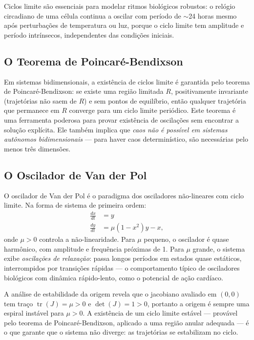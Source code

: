 Ciclos limite são essenciais para modelar ritmos biológicos robustos: o relógio circadiano
de uma célula continua a oscilar com período de $\sim$24 horas mesmo após perturbações de
temperatura ou luz, porque o ciclo limite tem amplitude e período intrínsecos, independentes
das condições iniciais.

\subsection{O Teorema de Poincaré-Bendixson}

Em sistemas bidimensionais, a existência de ciclos limite é garantida pelo teorema de
Poincaré-Bendixson: se existe uma região limitada $R$, positivamente invariante (trajetórias
não saem de $R$) e sem pontos de equilíbrio, então qualquer trajetória que permanece em $R$
converge para um ciclo limite periódico. Este teorema é uma ferramenta poderosa para provar
existência de oscilações sem encontrar a solução explícita. Ele também implica que
\emph{caos não é possível em sistemas autônomos bidimensionais} --- para haver caos
determinístico, são necessárias pelo menos três dimensões.

\subsection{O Oscilador de Van der Pol}

O oscilador de Van der Pol é o paradigma dos osciladores não-lineares com ciclo limite. Na
forma de sistema de primeira ordem:
\begin{align}
  \frac{dx}{dt} &= y \\
  \frac{dy}{dt} &= \mu(1 - x^2)y - x,
\end{align}
onde $\mu > 0$ controla a não-linearidade. Para $\mu$ pequeno, o oscilador é quase
harmônico, com amplitude e frequência próximas de 1. Para $\mu$ grande, o sistema exibe
\emph{oscilações de relaxação}: passa longos períodos em estados quase estáticos,
interrompidos por transições rápidas --- o comportamento típico de osciladores biológicos
com dinâmica rápido-lento, como o potencial de ação cardíaco.

A análise de estabilidade da origem revela que o jacobiano avaliado em $(0,0)$ tem traço
$\operatorname{tr}(J) = \mu > 0$ e $\det(J) = 1 > 0$, portanto a origem é sempre uma
espiral instável para $\mu > 0$. A existência de um ciclo limite estável --- provável pelo
teorema de Poincaré-Bendixson, aplicado a uma região anular adequada --- é o que garante
que o sistema não diverge: as trajetórias se estabilizam no ciclo.

